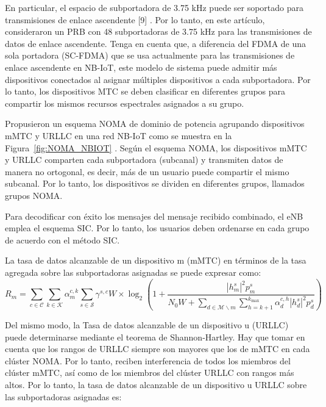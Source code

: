 En particular, el espacio de subportadora de 3.75 kHz puede ser soportado para transmisiones de enlace ascendente [9] . Por lo tanto, en este artículo, consideraron un PRB con 48 subportadoras de 3.75 kHz para las transmisiones de datos de enlace ascendente. Tenga en cuenta que, a diferencia del FDMA de una sola portadora (SC-FDMA) que se usa actualmente para las transmisiones de enlace ascendente en NB-IoT, este modelo de sistema puede admitir más dispositivos conectados al asignar múltiples dispositivos a cada subportadora. Por lo tanto, los dispositivos MTC se deben clasificar en diferentes grupos para compartir los mismos recursos espectrales asignados a su grupo.\newline

Propusieron un esquema NOMA de dominio de potencia agrupando dispositivos mMTC y URLLC en una red NB-IoT como se muestra en la Figura~\ref{fig:NOMA_NBIOT} . Según el esquema NOMA, los dispositivos mMTC y URLLC comparten cada subportadora (subcanal) y transmiten datos de manera no ortogonal, es decir, más de un usuario puede compartir el mismo subcanal. Por lo tanto, los dispositivos se dividen en diferentes grupos, llamados grupos NOMA.\newline

Para decodificar con éxito los mensajes del mensaje recibido combinado, el eNB emplea el esquema SIC. Por lo tanto, los usuarios deben ordenarse en cada grupo de acuerdo con el método SIC.\newline

La tasa de datos alcanzable de un dispositivo m (mMTC) en términos de la tasa agregada sobre las subportadoras asignadas se puede expresar como:
\begin{equation}
{R_{m}}=\sum \limits _{c \in \mathcal {C}} {\sum \limits _{k \in \mathcal {K}} {\alpha _{m}^{c,k}\sum \limits _{s \in \mathcal {S}} {{\gamma ^{s,c}}W} } } \times {\log _{2}}\left ({{1 + \frac {{{{\left |{ {h_{m}^{s}} }\right |}^{2}}p_{m}^{s}}}{{N_{0}W + \sum \limits _{d \in \mathcal {M}\backslash m} {\sum \limits _{h = k + 1}^{{k_{\max }}} {\alpha _{d}^{c,h}{{\left |{ {h_{d}^{s}} }\right |}^{2}}p_{d}^{s}} } }}} }\right)
\label{eqn:Rm}
\end{equation}

Del mismo modo, la Tasa de datos alcanzable de un dispositivo u (URLLC) puede determinarse mediante el teorema de Shannon-Hartley. Hay que tomar en cuenta que los rangos de URLLC siempre son mayores que los de mMTC en cada clúster NOMA. Por lo tanto, reciben interferencia de todos los miembros del clúster mMTC, así como de los miembros del clúster URLLC con rangos más altos. 
Por lo tanto, la tasa de datos alcanzable de un dispositivo u URLLC sobre las subportadoras asignadas es:

